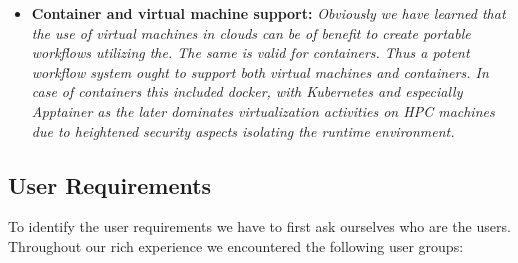 \documentclass[utf8]{FrontiersinVancouver} %
\begin{document}
\begin{BOX}
\begin{itemize}
{     integrated into the scientific research and benchmark efforts.}
 \item {\bf Container and virtual machine support:} {\it Obviously we
     have learned that the use of virtual machines in clouds can be of
     benefit to create portable workflows utilizing the. The same is
     valid for containers. Thus a potent workflow system ought to
     support both virtual machines and containers. In case of
     containers this included docker, with Kubernetes and especially Apptainer as the later
     dominates virtualization activities on HPC machines due to heightened security aspects
     isolating the runtime environment. }
  \end{itemize}
\end{BOX}

\subsection{User Requirements}
\label{sec:user-requirements}

To identify the user requirements we have to first ask ourselves who are the users. Throughout our rich experience we encountered the following user groups:
\end{document}
